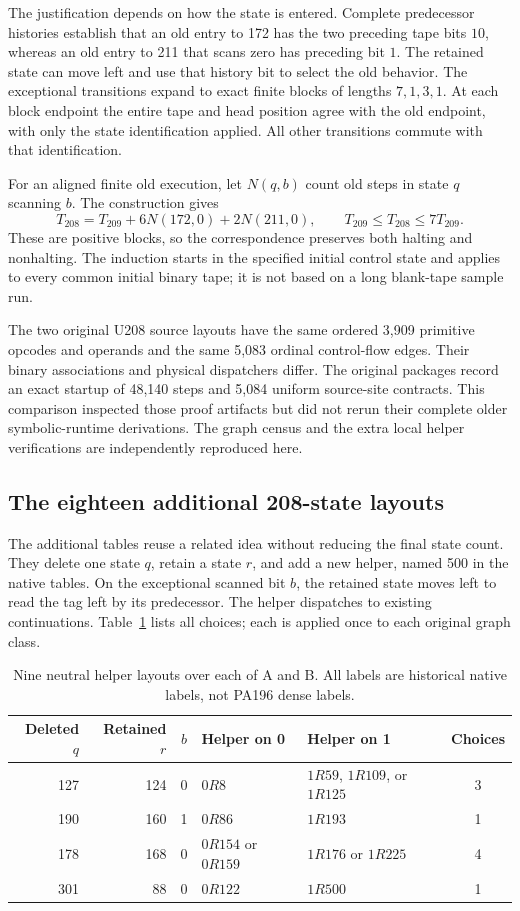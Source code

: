The justification depends on how the state is entered.  Complete predecessor
histories establish that an old entry to 172 has the two preceding tape bits
$10$, whereas an old entry to 211 that scans zero has preceding bit $1$.
The retained state can move left and use that history bit to select the old
behavior.  The exceptional transitions expand to exact finite blocks of
lengths $7,1,3,1$.  At each block endpoint the entire tape and head position
agree with the old endpoint, with only the state identification applied.
All other transitions commute with that identification.

For an aligned finite old execution, let $N(q,b)$ count old steps in state
$q$ scanning $b$.  The construction gives
\[
 T_{208}=T_{209}+6N(172,0)+2N(211,0),\qquad
 T_{209}\leq T_{208}\leq7T_{209}.
\]
These are positive blocks, so the correspondence preserves both halting and
nonhalting.  The induction starts in the specified initial control state and
applies to every common initial binary tape; it is not based on a long
blank-tape sample run.

The two original U208 source layouts have the same ordered 3,909 primitive
opcodes and operands and the same 5,083 ordinal control-flow edges.  Their
binary associations and physical dispatchers differ.  The original packages
record an exact startup of 48,140 steps and 5,084 uniform source-site
contracts.  This comparison inspected those proof artifacts but did not rerun
their complete older symbolic-runtime derivations.  The graph census and
the extra local helper verifications are independently reproduced here.

\subsection{The eighteen additional 208-state layouts}
The additional tables reuse a related idea without reducing the final state
count.  They delete one state $q$, retain a state $r$, and add a new helper,
named 500 in the native tables.  On the exceptional scanned bit $b$, the
retained state moves left to read the tag left by its predecessor.  The
helper dispatches to existing continuations.  Table~\ref{tab:helper-families}
lists all choices; each is applied once to each original graph class.

\begin{table}[htbp]
\centering\small
\begin{tabular}{@{}rrcllc@{}}
\toprule
Deleted $q$&Retained $r$&$b$&Helper on 0&Helper on 1&Choices\\
\midrule
127&124&0&$0R8$&$1R59$, $1R109$, or $1R125$&3\\
190&160&1&$0R86$&$1R193$&1\\
178&168&0&$0R154$ or $0R159$&$1R176$ or $1R225$&4\\
301&88&0&$0R122$&$1R500$&1\\
\bottomrule
\end{tabular}
\caption{Nine neutral helper layouts over each of A and B.  All labels are
historical native labels, not PA196 dense labels.}
\label{tab:helper-families}
\end{table}

